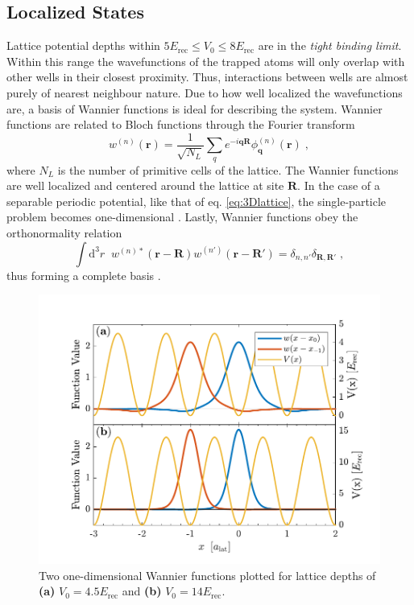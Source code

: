 \subsection{Localized States}
Lattice potential depths within $5 E_{\mathrm{rec}} \leq V_0 \leq 8 E_{\mathrm{rec}}$ are in the \textit{tight binding limit}. Within this range the wavefunctions of the trapped atoms will only overlap with other wells in their closest proximity. Thus, interactions between wells are almost purely of nearest neighbour nature. Due to how well localized the wavefunctions are, a basis of Wannier functions is ideal for describing the system. Wannier functions are related to Bloch functions through the Fourier transform \cite{kittel1963}
\begin{equation}
	w^{(n)}(\boldsymbol{r}) = \frac{1}{\sqrt{N_L}} \sum_{q} e^{ -i \boldsymbol{q} \boldsymbol{R} } \phi_{\boldsymbol{q}}^{(n)}(\boldsymbol{r}) \; ,
\end{equation} 
where $N_L$ is the number of primitive cells of the lattice. The Wannier functions are well localized and centered around the lattice at site $\boldsymbol{R}$. In the case of a separable periodic potential, like that of eq. \eqref{eq:3Dlattice}, the single-particle problem becomes one-dimensional \cite{kohn1959analyticWannier}. Lastly, Wannier functions obey the orthonormality relation
\begin{equation}
	\int \mathrm{d^3}r \; \; w^{(n) *}(\boldsymbol{r} - \boldsymbol{R}) w^{(n')}(\boldsymbol{r} - \boldsymbol{R'}) = \delta_{n,n'} \delta_{\boldsymbol{R},\boldsymbol{R}'} \; ,
\end{equation}
thus forming a complete basis \cite{manybodyBloch}. 
\begin{figure}[!h]
	\centering
	\includegraphics[width=0.8\columnwidth]{Figures/WannierFunctions.pdf} 
	\caption{Two one-dimensional Wannier functions plotted for lattice depths of \textbf{(a)} $V_0 = 4.5 E_{\mathrm{rec}}$ and \textbf{(b)} $V_0 = 14 E_{\mathrm{rec}}$.}
	\label{fig:WannierPlot} 
\end{figure}
